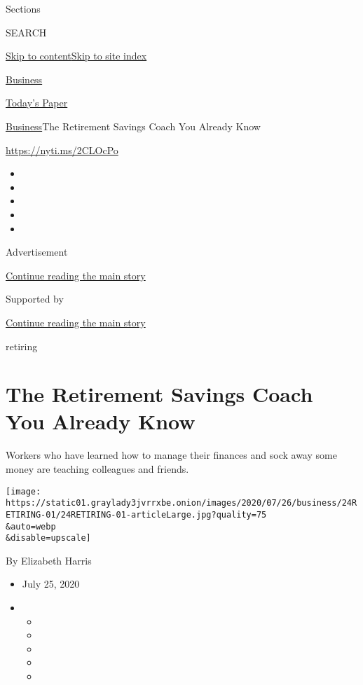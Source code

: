 Sections

SEARCH

\protect\hyperlink{site-content}{Skip to
content}\protect\hyperlink{site-index}{Skip to site index}

\href{https://www.nytimes3xbfgragh.onion/section/business}{Business}

\href{https://myaccount.nytimes3xbfgragh.onion/auth/login?response_type=cookie\&client_id=vi}{}

\href{https://www.nytimes3xbfgragh.onion/section/todayspaper}{Today's
Paper}

\href{/section/business}{Business}\textbar{}The Retirement Savings Coach
You Already Know

\href{https://nyti.ms/2CLOcPo}{https://nyti.ms/2CLOcPo}

\begin{itemize}
\item
\item
\item
\item
\item
\end{itemize}

Advertisement

\protect\hyperlink{after-top}{Continue reading the main story}

Supported by

\protect\hyperlink{after-sponsor}{Continue reading the main story}

retiring

\hypertarget{the-retirement-savings-coach-you-already-know}{%
\section{The Retirement Savings Coach You Already
Know}\label{the-retirement-savings-coach-you-already-know}}

Workers who have learned how to manage their finances and sock away some
money are teaching colleagues and friends.

\texttt{[image: https://static01.graylady3jvrrxbe.onion/images/2020/07/26/business/24RETIRING-01/24RETIRING-01-articleLarge.jpg?quality=75\\\&auto=webp\\\&disable=upscale]}

By Elizabeth Harris

\begin{itemize}
\item
  July 25, 2020
\item
  \begin{itemize}
  \item
  \item
  \item
  \item
  \item
  \end{itemize}
\end{itemize}

